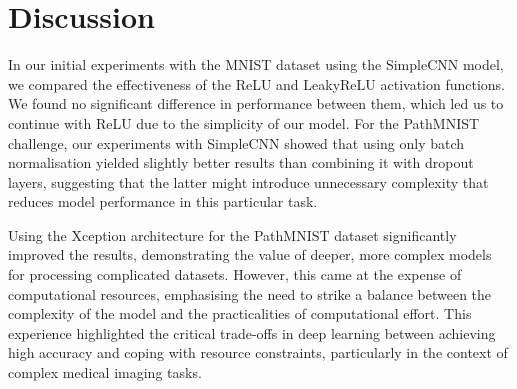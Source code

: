 \section{Discussion}\label{discussion}

In our initial experiments with the MNIST dataset using the SimpleCNN model, we compared the effectiveness of the ReLU and LeakyReLU activation functions. We found no significant difference in performance between them, which led us to continue with ReLU due to the simplicity of our model. For the PathMNIST challenge, our experiments with SimpleCNN showed that using only batch normalisation yielded slightly better results than combining it with dropout layers, suggesting that the latter might introduce unnecessary complexity that reduces model performance in this particular task.

Using the Xception architecture for the PathMNIST dataset significantly improved the results, demonstrating the value of deeper, more complex models for processing complicated datasets. However, this came at the expense of computational resources, emphasising the need to strike a balance between the complexity of the model and the practicalities of computational effort. This experience highlighted the critical trade-offs in deep learning between achieving high accuracy and coping with resource constraints, particularly in the context of complex medical imaging tasks.
